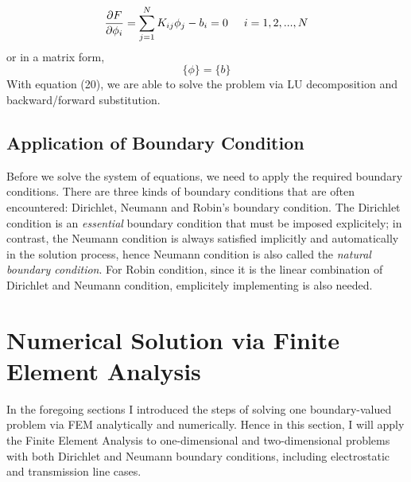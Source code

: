 \documentclass[journal]{IEEEtran}
\begin{document}
\begin{equation}
\frac{\partial F}{\partial \phi_i} = \sum_{j=1}^{N}K_{ij}\phi_j - b_i = 0 \hspace{0.5cm} i = 1,2,...,N
\end{equation}
or in a matrix form,
\begin{equation}
[K]\{\phi\} = \{b\}
\end{equation}
With equation (20), we are able to solve the problem via LU decomposition and backward/forward substitution.

\subsection{Application of Boundary Condition}
Before we solve the system of equations, we need to apply the required boundary conditions. There are three kinds of boundary conditions that are often encountered: Dirichlet, Neumann and Robin's boundary condition. The Dirichlet condition is an \textit{essential} boundary condition that must be imposed explicitely; in contrast, the Neumann condition is always satisfied implicitly and automatically in the solution process, hence Neumann condition is also called the \textit{natural boundary condition}. For Robin condition, since it is the linear combination of Dirichlet and Neumann condition, emplicitely implementing is also needed.

\section{Numerical Solution via Finite Element Analysis}
In the foregoing sections I introduced the steps of solving one boundary-valued problem via FEM analytically and numerically. Hence in this section, I will apply the Finite Element Analysis to one-dimensional and two-dimensional problems with both Dirichlet and Neumann boundary conditions, including electrostatic and transmission line cases.
\end{document}
